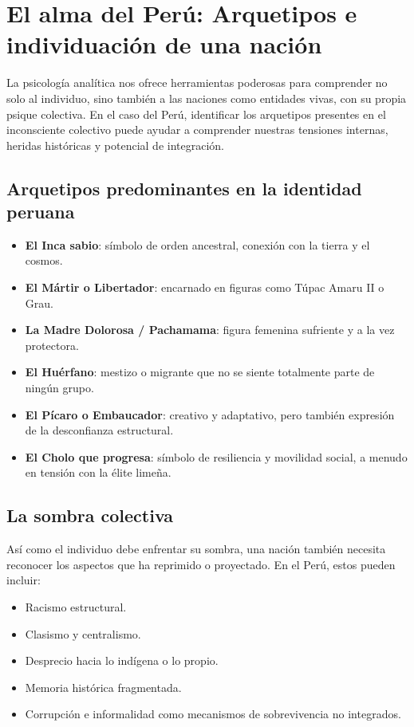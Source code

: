 	\section*{El alma del Perú: Arquetipos e individuación de una nación}

La psicología analítica nos ofrece herramientas poderosas para comprender no solo al individuo, sino también a las naciones como entidades vivas, con su propia psique colectiva. En el caso del Perú, identificar los arquetipos presentes en el inconsciente colectivo puede ayudar a comprender nuestras tensiones internas, heridas históricas y potencial de integración.

\subsection*{Arquetipos predominantes en la identidad peruana}
\begin{itemize}
	\item \textbf{El Inca sabio}: símbolo de orden ancestral, conexión con la tierra y el cosmos.
	\item \textbf{El Mártir o Libertador}: encarnado en figuras como Túpac Amaru II o Grau.
	\item \textbf{La Madre Dolorosa / Pachamama}: figura femenina sufriente y a la vez protectora.
	\item \textbf{El Huérfano}: mestizo o migrante que no se siente totalmente parte de ningún grupo.
	\item \textbf{El Pícaro o Embaucador}: creativo y adaptativo, pero también expresión de la desconfianza estructural.
	\item \textbf{El Cholo que progresa}: símbolo de resiliencia y movilidad social, a menudo en tensión con la élite limeña.
\end{itemize}

\subsection*{La sombra colectiva}
Así como el individuo debe enfrentar su sombra, una nación también necesita reconocer los aspectos que ha reprimido o proyectado. En el Perú, estos pueden incluir:
\begin{itemize}
	\item Racismo estructural.
	\item Clasismo y centralismo.
	\item Desprecio hacia lo indígena o lo propio.
	\item Memoria histórica fragmentada.
	\item Corrupción e informalidad como mecanismos de sobrevivencia no integrados.
\end{itemize}


